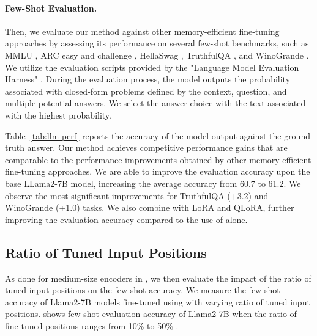 \paragraph{Few-Shot Evaluation.} 
Then, we evaluate our method against other memory-efficient fine-tuning approaches by assessing its performance on several few-shot benchmarks, such as MMLU \citep{hendrycks_21}, ARC easy and challenge \citep{clark_18}, HellaSwag \citep{zellers19}, TruthfulQA \citep{lin_22}, and WinoGrande \citep{DBLP:conf/aaai/SakaguchiBBC20}. We utilize the evaluation scripts provided by the "Language Model Evaluation Harness" \citep{eval-harness}. During the evaluation process, the model outputs the probability associated with closed-form problems defined by the context, question, and multiple potential answers. We select the answer choice with the text associated with the highest probability. 

Table~\ref{tab:llm-perf} reports the accuracy of the model output against the ground truth answer. 
Our method achieves competitive performance gains that are comparable to the performance improvements obtained by other memory efficient fine-tuning approaches. 
We are able to improve the evaluation accuracy upon the base LLama2-7B model, increasing the average accuracy from 60.7 to 61.2. We observe the most significant improvements for TruthfulQA (+3.2) and WinoGrande (+1.0) tasks. We also combine \method with LoRA and QLoRA, further improving the evaluation accuracy compared to the use of \method alone.


	












\subsection{Ratio of Tuned Input Positions}

As done for medium-size encoders in , we then evaluate the impact of the ratio of tuned input positions on the few-shot accuracy. 
We measure the few-shot accuracy of Llama2-7B models fine-tuned using \method with varying ratio of tuned input positions. 
 shows few-shot evaluation accuracy of Llama2-7B when the ratio of fine-tuned positions ranges from 10\% to 50\% .


